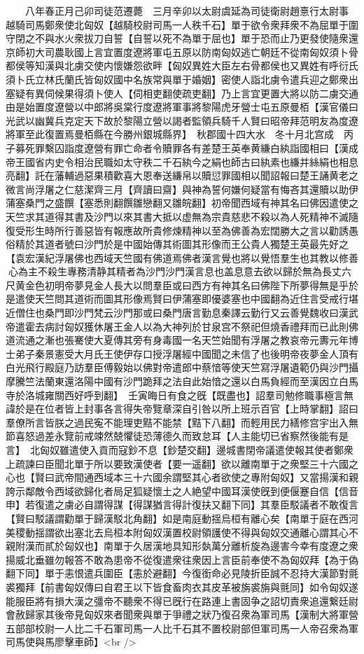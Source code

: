 　　八年春正月己卯司徒范遷薨　三月辛卯以太尉虞延為司徒衛尉趙憙行太尉事　越騎司馬鄭衆使北匈奴【越騎校尉司馬一人秩千石】單于欲令衆拜衆不為屈單于圍守閉之不與水火衆拔刀自誓【自誓以死不為單于屈也】單于恐而止乃更發使隨衆還京師初大司農耿國上言宜置度遼將軍屯五原以防南匈奴逃亡朝廷不從南匈奴須卜骨都侯等知漢與北虜交使内懷嫌怨欲畔【匈奴異姓大臣左右骨都侯也又異姓有呼衍氏須卜氏立林氏蘭氏皆匈奴國中名族常與單于婚姻】密使人詣北虜令遣兵迎之鄭衆出塞疑有異伺候果得須卜使人【伺相吏翻使疏吏翻】乃上言宜更置大將以防二虜交通由是始置度遼營以中郎將吳棠行度遼將軍事將黎陽虎牙營士屯五原曼栢【漢官儀曰光武以幽冀兵克定天下故於黎陽立營以謁者監領兵騎千人賢曰昭帝拜范明友為度遼將軍至此復置焉曼栢縣在今勝州銀城縣界】　秋郡國十四大水　冬十月北宫成　丙子募死罪繫囚詣度遼營有罪亡命者令贖罪各有差楚王英奉黄縑白紈詣國相曰【漢成帝王國省内史令相治民職如太守秩二千石紈今之絹也師古曰紈素也縑并絲絹也相息亮翻】託在藩輔過惡果積歡喜大恩奉送縑帛以贖愆罪國相以聞詔報曰楚王誦黄老之微言尚浮屠之仁慈潔齊三月【齊讀曰齋】與神為誓何嫌何疑當有悔吝其還贖以助伊蒲塞桑門之盛饌【塞悉則翻饌雛戀翻又雛皖翻】初帝聞西域有神其名曰佛因遣使之天竺求其道得其書及沙門以來其書大抵以虚無為宗貴慈悲不殺以為人死精神不滅隨復受形生時所行善惡皆有報應故所貴修煉精神以至為佛善為宏闊勝大之言以勸誘愚俗精於其道者號曰沙門於是中國始傳其術圖其形像而王公貴人獨楚王英最先好之【袁宏漢紀浮屠佛也西域天竺國有佛道焉佛者漢言覺也將以覺悟羣生也其教以修善心為主不殺生專務清静其精者為沙門沙門漢言息也盖息意去欲以歸於無為長丈六尺黄金色初明帝夢見金人長大以問羣臣或曰西方有神其名曰佛陛下所夢得無是乎於是遣使天竺問其道術而圖其形像焉賢曰伊蒲塞即優婆塞也中國翻為近住言受戒行堪近僧住也桑門即沙門梵云沙門那或曰桑門唐言勤息秦譯云勤行又云善覺魏收曰漢武帝遣霍去病討匈奴獲休屠王金人以為大神列於甘泉宫不祭祀但燒香禮拜而已此則佛道流通之漸也張騫使大夏傳其旁有身毒國一名天竺始聞有浮屠之教哀帝元夀元年博士弟子秦景憲受大月氏王使伊存口授浮屠經中國聞之未信了也後明帝夜夢金人頂有白光飛行殿庭乃訪羣臣傅毅始以佛對帝遣郎中蔡愔等使天竺寫浮屠遺範仍與沙門攝摩騰竺法蘭東還洛陽中國有沙門跪拜之法自此始愔之還以白馬負經而至漢因立白馬寺於洛城雍關西好呼到翻】　壬寅晦日有食之旣【既盡也】詔羣司勉修職事極言無諱於是在位者皆上封事各言得失帝覽章深自引咎以所上班示百官【上時掌翻】詔曰羣僚所言皆朕之過民寃不能理吏黠不能禁【黠下八翻】而輕用民力繕修宫宇出入無節喜怒過差永覽前戒竦然兢懼徒恐薄德久而致怠耳【人主能切已省察然後能有是言】　北匈奴雖遣使入貢而寇鈔不息【鈔楚交翻】邊城書閉帝議遣使報其使者鄭衆上疏諫曰臣聞北單于所以要致漢使者【要一遥翻】欲以離南單于之衆堅三十六國之心也【賢曰武帝間通西域本三十六國余謂堅其心者欲使之專附匈奴】又當揚漢和親誇示鄰敵令西域欲歸化者局足狐疑懷土之人絶望中國耳漢使旣到便偃蹇自信【信音申】若復遣之虜必自謂得謀【得謀猶言得計復扶又翻下同】其羣臣駁議者不敢復言【賢曰駁議謂勸單于歸漢駁北角翻】如是南庭動揺烏桓有離心矣【南單于庭在西河美稷動揺謂欲出塞北去烏桓本附匈奴漢置校尉領護使不得與匈奴交通離心謂其心不親附漢而貳於匈奴也】南單于久居漢地具知形埶萬分離析旋為邊害今幸有度遼之衆揚威北垂雖勿報答不敢為患帝不從復遣衆往衆因上言臣前奉使不為匈奴拜【為于偽翻下同】單于恚恨遣兵圍臣【恚於避翻】今復銜命必見陵折臣誠不忍持大漢節對氈裘獨拜【前書匈奴傳曰自君王以下皆食畜肉衣其皮革被旃裘旃與氈同】如令匈奴遂能服臣將有損大漢之彊帝不聽衆不得已旣行在路連上書固争之詔切責衆追還繋廷尉會赦歸家其後帝見匈奴來者聞衆與單于爭禮之狀乃復召衆為軍司馬【漢制大將軍營五部部校尉一人比二千石軍司馬一人比千石其不置校尉部但軍司馬一人帝召衆為軍司馬使與馬廖擊車師】<br />
